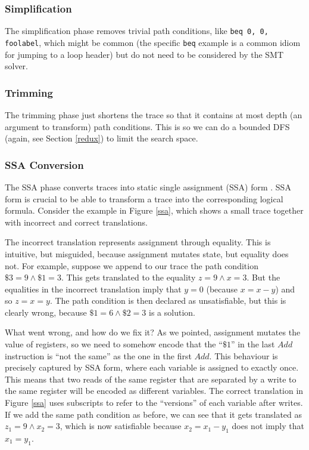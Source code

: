 \documentclass{llncs}
\begin{document}
\subsubsection{Simplification}

The simplification phase removes trivial path conditions, like \lstinline{beq 0, 0, foolabel}, which might be common (the specific \lstinline{beq} example is a common idiom for jumping to a loop header) but do not need to be considered by the SMT solver.

\subsubsection{Trimming}

The trimming phase just shortens the trace so that it contains at most \textsf{depth} (an argument to \textsf{transform}) path conditions. This is so we can do a bounded DFS (again, see Section \ref{redux}) to limit the search space.

\subsubsection{SSA Conversion}

The SSA phase converts traces into static single assignment (SSA) form \cite{cytron1991efficiently}. SSA form is crucial to be able to transform a trace into the corresponding logical formula. Consider the example in Figure \ref{ssa}, which shows a small trace together with incorrect and correct translations.

The incorrect translation represents assignment through equality. This is intuitive, but misguided, because assignment mutates state, but equality does not. For example, suppose we append to our trace the path condition $\$3 = 9 \land \$1 = 3$. This gets translated to the equality $z = 9 \land x = 3$. But the equalities in the incorrect translation imply that $y = 0$ (because $x = x - y$) and so $z = x = y$. The path condition is then declared as unsatisfiable, but this is clearly wrong, because $\$1 = 6 \land \$2 = 3$ is a solution. 

What went wrong, and how do we fix it? As we pointed, assignment mutates the value of registers, so we need to somehow encode that the ``$\$1$'' in the last $Add$ instruction is ``not the same'' as the one in the first $Add$. This behaviour is precisely captured by SSA form, where each variable is assigned to exactly once. This means that two reads of the same register that are separated by a write to the same register will be encoded as different variables. The correct translation in Figure \ref{ssa} uses subscripts to refer to the ``versions'' of each variable after writes. If we add the same path condition as before, we can see that it gets translated as $z_1 = 9 \land x_2 = 3$, which is now satisfiable because $x_2 = x_1 - y_1$ does not imply that $x_1 = y_1$.
\end{document}
